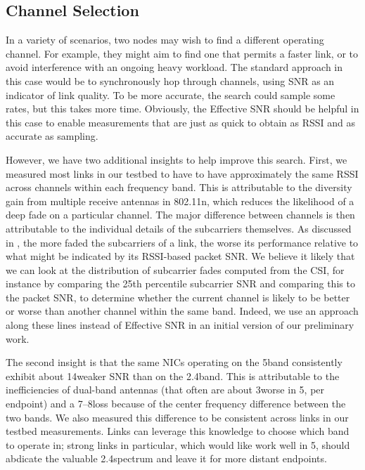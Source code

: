 \subsection{Channel Selection}
In a variety of scenarios, two nodes may wish to find a different operating channel. For example, they might aim to find one that permits a faster link, or to avoid interference with an ongoing heavy workload. The standard approach in this case would be to synchronously hop through channels, using SNR as an indicator of link quality. To be more accurate, the search could sample some rates, but this takes more time. Obviously, the Effective SNR should be helpful in this case to enable measurements that are just as quick to obtain as RSSI and as accurate as sampling.

However, we have two additional insights to help improve this search. First, we measured most links in our testbed to have to have approximately the same RSSI across channels within each frequency band. This is attributable to the diversity gain from multiple receive antennas in 802.11n, which reduces the likelihood of a deep fade on a particular channel. The major difference between channels is then attributable to the individual details of the subcarriers themselves. As discussed in , the more faded the subcarriers of a link, the worse its performance relative to what might be indicated by its RSSI-based packet SNR\@. We believe it likely that we can look at the distribution of subcarrier fades computed from the CSI, for instance by comparing the 25th percentile subcarrier SNR and comparing this to the packet SNR, to determine whether the current channel is likely to be better or worse than another channel within the same band. Indeed, we use an approach along these lines instead of Effective SNR in an initial version of our preliminary work.

The second insight is that the same NICs operating on the 5\GHz band consistently exhibit about 14\dB weaker SNR than on the 2.4\GHz band. This is attributable to the inefficiencies of dual-band antennas (that often are about 3\dBi worse in 5\GHz, per endpoint) and a 7\dB--8\dB loss because of the center frequency difference between the two bands. We also measured this difference to be consistent across links in our testbed measurements. Links can leverage this knowledge to choose which band to operate in; strong links in particular, which would like work well in 5\GHz, should abdicate the valuable 2.4\GHz spectrum and leave it for more distant endpoints.

